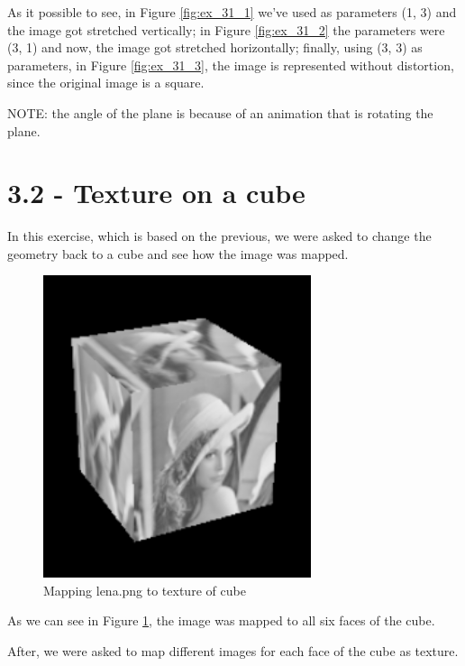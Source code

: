 \documentclass[12pt]{article}
\begin{document}
\noindent
As it possible to see, in Figure \ref{fig:ex_31_1} we've used as parameters (1, 3) and the image got stretched vertically; in Figure \ref{fig:ex_31_2} the parameters were (3, 1) and now, the image got stretched horizontally; finally, using (3, 3) as parameters, in Figure \ref{fig:ex_31_3}, the image is represented without distortion, since the original image is a square.\par

NOTE: the angle of the plane is because of an animation that is rotating the plane.


\section*{3.2 - Texture on a cube}
\label{ex_32}

In this exercise, which is based on the previous, we were asked to change the geometry back to a cube and see how the image was mapped.

\begin{figure}[!h]
    \centering
        \includegraphics[width = 0.7\textwidth]{figs/ex_32_lena.png}
        \caption{Mapping  lena.png to texture of cube}
        \label{figs:ex_32_lena}
\end{figure}

As we can see in Figure \ref{figs:ex_32_lena}, the image was mapped to all six faces of the cube.

After, we were asked to map different images for each face of the cube as texture.\par
\end{document}
